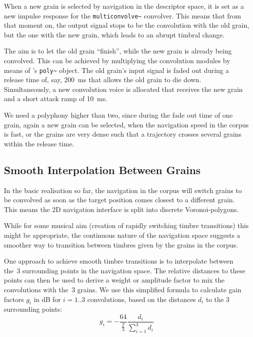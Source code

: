 When a new grain is selected by navigation in the descriptor space, it is set as a new impulse response for the \verb|multiconvolve~| convolver.  This means that from that moment on, the output signal stops to be the convolution with the old grain, but the one with the new grain, which leads to an abrupt timbral change.

The aim is to let the old grain ``finish'', while the new grain is already being convolved.  This can be achieved by multiplying the convolution modules by means of \maxmsp's \verb|poly~| object.  The old grain's input signal is faded out during a release time of, say, 200~ms that allows the old grain to die down.  Simultaneously, a new convolution voice is allocated that receives the new grain and a short attack ramp of 10~ms.

We need a polyphony higher than two, since during the fade out time of one grain, again a new grain can be selected, when the navigation speed in the corpus is fast, or the grains are very dense such that a trajectory crosses several grains within the release time.


\subsection{Smooth Interpolation Between Grains}\label{sec:mix}


In the basic realisation so far, the navigation in the corpus will switch grains to be convolved as soon as the target position comes closest to a different grain.  
This means the 2D navigation interface is split into discrete Voronoi-polygons.

While for some musical aim (creation of rapidly switching timbre transitions) this might be appropriate, the continuous nature of the navigation space suggests a smoother way to transition between timbres given by the grains in the corpus.

One approach to achieve smooth timbre transitions is to interpolate between the~3 surrounding points in the navigation space.  The relative distances to these points can then be used to derive a weight or amplitude factor \cite{FreedMacCallumSchmederWessel-nime2010-hybridization-interfaces} to mix the convolutions with the~3 grains.  We use this simplified formula to calculate gain factors $g_i$ in dB for $i = 1..3$ convolutions, based on the distances $d_i$ to the 3 surrounding points:
%
\begin{equation}
  g_i = -\frac{64}{\frac{2}{3}} \frac{d_i}{\sum_{i=1}^3 d_i}
\end{equation}

